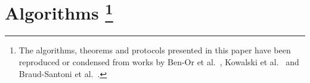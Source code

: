 ﻿\section{Algorithms
\protect\footnote{The algorithms, theorems and protocols presented in this paper have been reproduced or condensed from works by Ben-Or et al.~\cite{BPV06}, Kowalski et al.~\cite{KM13} and Braud-Santoni et al.~\cite{BGH13}.}}
\label{sec:algos}


